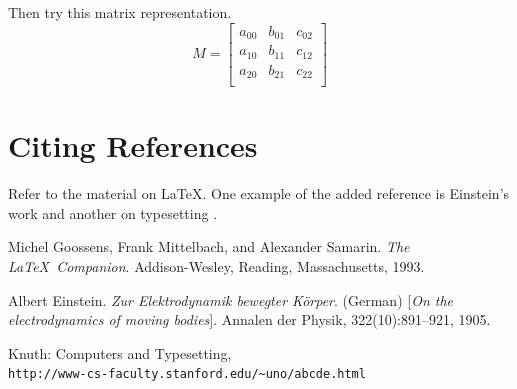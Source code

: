 \documentclass[a4paper,10pt]{article}
\begin{document}
Then try this matrix representation.
$$
M = \begin{bmatrix}
a_{00} & b_{01} & c_{02}\\[0.3em]
a_{10} & b_{11} & c_{12}\\[0.3em]
a_{20} & b_{21} & c_{22} \\[0.3em]
\end{bmatrix}
$$

\section{Citing References}
Refer to the material on \LaTeX \cite{latexcompanion}. One example of the added reference is Einstein's work \cite{einstein} and another on typesetting \cite{knuthwebsite}.

\begin{thebibliography}{9}
Michel Goossens, Frank Mittelbach, and Alexander Samarin. 
\textit{The \LaTeX\ Companion}. 
Addison-Wesley, Reading, Massachusetts, 1993.
 
Albert Einstein. 
\textit{Zur Elektrodynamik bewegter K{\"o}rper}. (German) 
[\textit{On the electrodynamics of moving bodies}]. 
Annalen der Physik, 322(10):891–921, 1905.
 
Knuth: Computers and Typesetting,
\\\texttt{http://www-cs-faculty.stanford.edu/\~{}uno/abcde.html}
\end{thebibliography}
\end{document}
